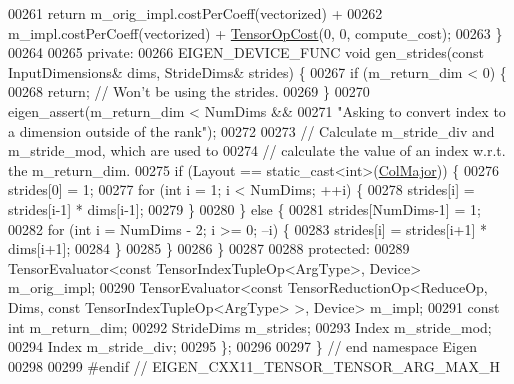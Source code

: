 \begin{DoxyCode}
00261     \textcolor{keywordflow}{return} m\_orig\_impl.costPerCoeff(vectorized) +
00262            m\_impl.costPerCoeff(vectorized) + \hyperlink{class_eigen_1_1_tensor_op_cost}{TensorOpCost}(0, 0, compute\_cost);
00263   \}
00264 
00265  \textcolor{keyword}{private}:
00266   EIGEN\_DEVICE\_FUNC \textcolor{keywordtype}{void} gen\_strides(\textcolor{keyword}{const} InputDimensions& dims, StrideDims& strides) \{
00267     \textcolor{keywordflow}{if} (m\_return\_dim < 0) \{
00268       \textcolor{keywordflow}{return};  \textcolor{comment}{// Won't be using the strides.}
00269     \}
00270     eigen\_assert(m\_return\_dim < NumDims &&
00271                  \textcolor{stringliteral}{"Asking to convert index to a dimension outside of the rank"});
00272 
00273     \textcolor{comment}{// Calculate m\_stride\_div and m\_stride\_mod, which are used to}
00274     \textcolor{comment}{// calculate the value of an index w.r.t. the m\_return\_dim.}
00275     \textcolor{keywordflow}{if} (Layout == static\_cast<int>(\hyperlink{group__enums_ggaacded1a18ae58b0f554751f6cdf9eb13a0cbd4bdd0abcfc0224c5fcb5e4f6669a}{ColMajor})) \{
00276       strides[0] = 1;
00277       \textcolor{keywordflow}{for} (\textcolor{keywordtype}{int} i = 1; i < NumDims; ++i) \{
00278         strides[i] = strides[i-1] * dims[i-1];
00279       \}
00280     \} \textcolor{keywordflow}{else} \{
00281       strides[NumDims-1] = 1;
00282       \textcolor{keywordflow}{for} (\textcolor{keywordtype}{int} i = NumDims - 2; i >= 0; --i) \{
00283         strides[i] = strides[i+1] * dims[i+1];
00284       \}
00285     \}
00286   \}
00287 
00288  \textcolor{keyword}{protected}:
00289   TensorEvaluator<const TensorIndexTupleOp<ArgType>, Device> m\_orig\_impl;
00290   TensorEvaluator<const TensorReductionOp<ReduceOp, Dims, const TensorIndexTupleOp<ArgType> >, Device> 
      m\_impl;
00291   \textcolor{keyword}{const} \textcolor{keywordtype}{int} m\_return\_dim;
00292   StrideDims m\_strides;
00293   Index m\_stride\_mod;
00294   Index m\_stride\_div;
00295 \};
00296 
00297 \} \textcolor{comment}{// end namespace Eigen}
00298 
00299 \textcolor{preprocessor}{#endif // EIGEN\_CXX11\_TENSOR\_TENSOR\_ARG\_MAX\_H}
\end{DoxyCode}
